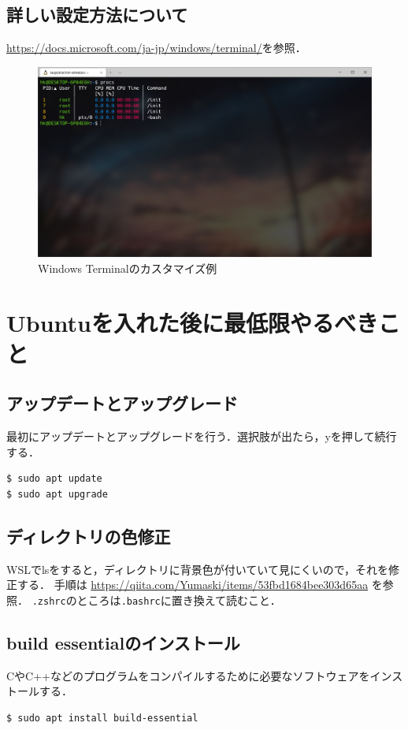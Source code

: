\documentclass[uplatex]{jsarticle}
\begin{document}
\newpage
\subsection{詳しい設定方法について}
\url{https://docs.microsoft.com/ja-jp/windows/terminal/}を参照．

\begin{figure}[h]
\centering
\includegraphics[scale=0.45]{./図/myterminal.png}
\caption{Windows Terminalのカスタマイズ例}
\end{figure}

\newpage
\section{Ubuntuを入れた後に最低限やるべきこと}
\subsection{アップデートとアップグレード}
最初にアップデートとアップグレードを行う．選択肢が出たら，yを押して続行する．

\vspace{5pt}
\begin{lstlisting}[style=command]
$ sudo apt update
$ sudo apt upgrade
\end{lstlisting}

\subsection{ディレクトリの色修正}
WSLでlsをすると，ディレクトリに背景色が付いていて見にくいので，それを修正する．
手順は
\url{https://qiita.com/Yumaski/items/53fbd1684bee303d65aa}
を参照．
\verb|.zshrc|のところは\verb|.bashrc|に置き換えて読むこと．


\subsection{build essentialのインストール}
CやC++などのプログラムをコンパイルするために必要なソフトウェアをインストールする．

\vspace{5pt}
\begin{lstlisting}[style=command]
$ sudo apt install build-essential
\end{lstlisting}
\end{document}

